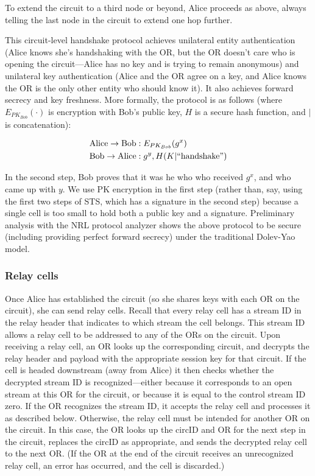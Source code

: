 \documentclass[times,10pt,twocolumn]{article}
\begin{document}
To extend the circuit to a third node or beyond, Alice
proceeds as above, always telling the last node in the circuit to
extend one hop further.

This circuit-level handshake protocol achieves unilateral entity
authentication (Alice knows she's handshaking with the OR, but
the OR doesn't care who is opening the circuit---Alice has no key
and is trying to remain anonymous) and unilateral key authentication
(Alice and the OR agree on a key, and Alice knows the OR is the
only other entity who should know it). It also achieves forward
secrecy and key freshness. More formally, the protocol is as follows
(where $E_{PK_{Bob}}(\cdot)$ is encryption with Bob's public key,
$H$ is a secure hash function, and $|$ is concatenation):

\begin{equation}
\begin{aligned}
\mathrm{Alice} \rightarrow \mathrm{Bob}&: E_{PK_{Bob}}(g^x) \\
\mathrm{Bob} \rightarrow \mathrm{Alice}&: g^y, H(K | \mathrm{``handshake"}) \\
\end{aligned}
\end{equation}

In the second step, Bob proves that it was he who who received $g^x$,
and who came up with $y$. We use PK encryption in the first step
(rather than, say, using the first two steps of STS, which has a
signature in the second step) because a single cell is too small to
hold both a public key and a signature. Preliminary analysis with the
NRL protocol analyzer \cite{meadows96} shows the above protocol to be
secure (including providing perfect forward secrecy) under the
traditional Dolev-Yao model.

\subsubsection{Relay cells}

Once Alice has established the circuit (so she shares keys with each
OR on the circuit), she can send relay cells.  Recall that every relay
cell has a stream ID in the relay header that indicates to which
stream the cell belongs.  This stream ID allows a relay cell to be
addressed to any of the ORs on the circuit.  Upon receiving a relay
cell, an OR looks up the corresponding circuit, and decrypts the relay
header and payload with the appropriate session key for that circuit.
If the cell is headed downstream (away from Alice) it then checks
whether the decrypted stream ID is recognized---either because it
corresponds to an open stream at this OR for the circuit, or because
it is equal to the control stream ID zero.  If the OR recognizes the
stream ID, it accepts the relay cell and processes it as described
below.  Otherwise, the relay cell must be intended for another OR on
the circuit.  In this case, the OR looks up the circID and OR for the
next step in the circuit, replaces the circID as appropriate, and
sends the decrypted relay cell to the next OR.  (If the OR at the end
of the circuit receives an unrecognized relay cell, an error has
occurred, and the cell is discarded.)
\end{document}
